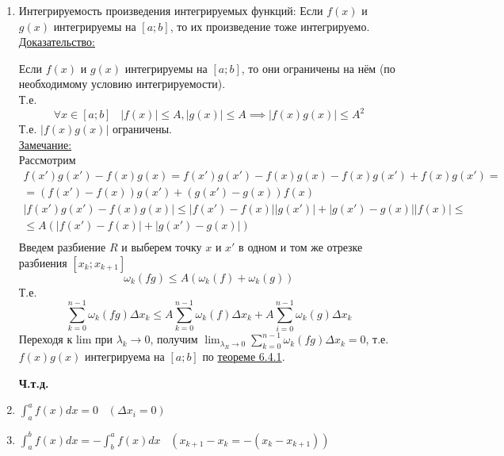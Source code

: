 \documentclass[12pt]{article}
\begin{document}
\begin{enumerate}
\begin{adjustwidth}{1.5em}{1.5em}
            Т.к. $f(x)$ и $g(x)$ интегрируемы на $[a; b]$, то $\exists$ конечный предел правой части $\implies$ $\exists$ конечный предел и левой части: 
            \[ \lim_{\lambda_R \to 0}\sigma_R (\lambda f + \mu g) = \lambda \lim_{\lambda_R \to 0}\sigma_R(f)+\mu \lim_{\lambda_R \to 0}\sigma_R(g) \]
            \[ \int_{a}^{b}[\lambda f(x)+\mu g(x)]dx=\lambda \int_{a}^{b}f(x)dx+\mu \int_{a}^{b} g(x)dx \]
            \begin{center}
                \textbf{Ч.т.д.}
            \end{center}
        \end{adjustwidth}
        \item Интегрируемость произведения интегрируемых функций: Если $f(x)$ и $g(x)$ интегрируемы на $[a; b]$, то их произведение тоже интегрируемо.\\
        \underline{Доказательство:}
        \begin{adjustwidth}{1.5em}{1.5em}
            Если $f(x)$ и $g(x)$ интегрируемы на $[a; b]$, то они ограничены на нём (по необходимому условию интегрируемости).\\
            Т.е. 
            \[ \forall x \in [a;b] \;\;\; |f(x)|\leq A,|g(x)|\leq A \implies |f(x)g(x)|\leq A^2\]
            Т.е. $|f(x)g(x)|$ ограничены.\\
            \underline{Замечание:}\\
            Рассмотрим 
            \begin{gather*}
                f(x')g(x')-f(x)g(x)=f(x')g(x')-f(x)g(x)-f(x)g(x')+f(x)g(x') =\\
                = (f(x')-f(x))g(x')+(g(x')-g(x))f(x)\\
                |f(x')g(x')-f(x)g(x)| \leq |f(x')-f(x)||g(x')|+|g(x')-g(x)||f(x)| \leq\\
                \leq A(|f(x')-f(x)|+|g(x')-g(x)|)\\
            \end{gather*}
            Введем разбиение $R$ и выберем точку $x$ и $x'$ в одном и том же отрезке разбиения $[x_k;x_{k+1}]$ 
            \[ \omega_k(fg)\leq A(\omega_k(f)+\omega_k(g)) \]
            Т.е. 
            \[\sum_{k=0}^{n-1} \omega_k (fg) \Delta x_k \leq A \sum_{k=0}^{n-1}\omega_k(f)\Delta x_k+A\sum_{i=0}^{n-1}\omega_k(g)\Delta x_k\]
            Переходя к lim при $\lambda_k \to 0$, получим $\lim_{\lambda_R \to 0} \sum_{k=0}^{n-1} \omega_k(fg) \Delta x_k=0$, т.е. $f(x)g(x)$ интегрируема на $[a; b]$ по \hyperref[th:6.4.1]{теореме 6.4.1}.
            \begin{center}
                \textbf{Ч.т.д.}
            \end{center}
        \end{adjustwidth}
        \item $\int_{a}^{a} f(x)dx=0 \;\;\; (\Delta x_i=0)$
        \item $\int_{a}^{b} f(x)dx=-\int_{b}^{a} f(x)dx \;\;\; (x_{k+1}-x_k=-(x_k-x_{k+1}))$
    \end{enumerate}
    
\end{document}
